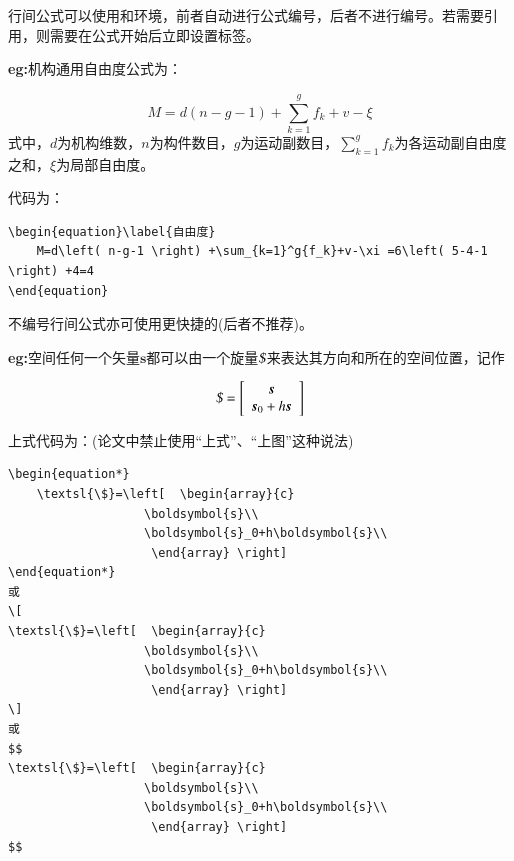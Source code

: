 行间公式可以使用和环境，前者自动进行公式编号，后者不进行编号。若需要引用，则需要在公式开始后立即设置标签。
\vspace{2em}

\textbf{eg:}机构通用自由度公式\cite{HuangZhen2011LunJiGouZiYouDu}为：

\begin{equation}\label{自由度}
    M=d\left( n-g-1 \right) +\sum_{k=1}^g{f_k}+v-\xi
\end{equation}
式中，$d$为机构维数，$n$为构件数目，$g$为运动副数目，$\sum_{k=1}^g{f_k}$为各运动副自由度之和，$\xi$为局部自由度。

代码为：

\begin{lstlisting}[language={[LaTeX]TeX}]
\begin{equation}\label{自由度}
    M=d\left( n-g-1 \right) +\sum_{k=1}^g{f_k}+v-\xi =6\left( 5-4-1 \right) +4=4
\end{equation}
\end{lstlisting}

不编号行间公式亦可使用更快捷的\cs{[...}\cs{]或\$\$...\$\$}(后者不推荐)。

\textbf{eg:}空间任何一个矢量$\boldsymbol{s}$都可以由一个旋量$\textsl{\$}$来表达其方向和所在的空间位置\cite{GuoFang2007BingLianJiQiRenJiGouZongHeFangFaBiJiaoYanJiu}，记作

\begin{equation*}
    \textsl{\$}=\left[  \begin{array}{c}
	               \boldsymbol{s}\\
	               \boldsymbol{s}_0+h\boldsymbol{s}\\
                    \end{array} \right] 
\end{equation*}

上式代码为：(论文中禁止使用“上式”、“上图”这种说法)
\begin{lstlisting}[language={[LaTeX]TeX}]
\begin{equation*}
    \textsl{\$}=\left[  \begin{array}{c}
	               \boldsymbol{s}\\
	               \boldsymbol{s}_0+h\boldsymbol{s}\\
                    \end{array} \right] 
\end{equation*}
或
\[
\textsl{\$}=\left[  \begin{array}{c}
	               \boldsymbol{s}\\
	               \boldsymbol{s}_0+h\boldsymbol{s}\\
                    \end{array} \right] 
\]
或
$$
\textsl{\$}=\left[  \begin{array}{c}
	               \boldsymbol{s}\\
	               \boldsymbol{s}_0+h\boldsymbol{s}\\
                    \end{array} \right] 
$$
\end{lstlisting}





